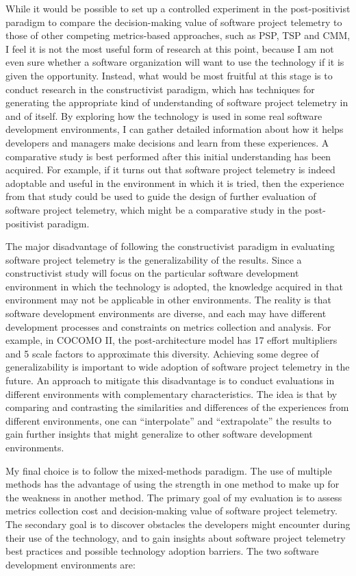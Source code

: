 While it would be possible to set up a controlled experiment in the post-positivist paradigm to compare the decision-making value of software project telemetry to those of other competing metrics-based approaches, such as PSP, TSP and CMM, I feel it is not the most useful form of research at this point, because I am not even sure whether a software organization will want to use the technology if it is given the opportunity.
Instead, what would be most fruitful at this stage is to conduct research in the constructivist paradigm, which has techniques for generating the appropriate kind of understanding of software project telemetry in and of itself. By exploring how the technology is used in some real software development environments, I can gather detailed information about how it helps developers and managers make decisions and learn from these experiences. 
A comparative study is best performed after this initial understanding has been acquired. 
For example, if it turns out that software project telemetry is indeed adoptable and useful in the environment in which it is tried, then the experience from that study could be used to guide the design of further evaluation of software project telemetry, which might be a comparative study in the post-positivist paradigm.

The major disadvantage of following the constructivist paradigm in evaluating software project telemetry is the generalizability of the results. Since a constructivist study will focus on the particular software development environment in which the technology is adopted, the knowledge acquired in that environment may not be applicable in other environments. The reality is that software development environments are diverse, and each may have different development processes and constraints on metrics collection and analysis. For example, in COCOMO II, the post-architecture model has 17 effort multipliers and 5 scale factors to approximate this diversity. Achieving some degree of generalizability is important to wide adoption of software project telemetry in the future. An approach to mitigate this disadvantage is to conduct evaluations in different environments with complementary characteristics. The idea is that by comparing and contrasting the similarities and differences of the experiences from different environments, one can ``interpolate'' and ``extrapolate'' the results to gain further insights that might generalize to other software development environments.

My final choice is to follow the mixed-methods paradigm. The use of multiple methods has the advantage of using the strength in one method to make up for the weakness in another method. The primary goal of my evaluation is to assess metrics collection cost and decision-making value of software project telemetry. The secondary goal is to discover obstacles the developers might encounter during their use of the technology, and to gain insights about software project telemetry best practices and possible technology adoption barriers. The two software development environments are:

